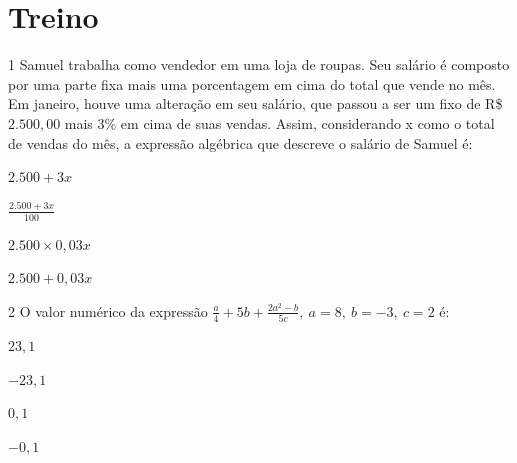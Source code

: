 \section{Treino}

\num{1} Samuel trabalha como vendedor em uma loja de roupas. Seu salário é
composto por uma parte fixa mais uma porcentagem em cima do total que
vende no mês. Em janeiro, houve uma alteração em seu salário, que passou
a ser um fixo de R\$ $2.500,00$ mais 3\% em cima de suas vendas. Assim,
considerando x como o total de vendas do mês, a expressão algébrica
que descreve o salário de Samuel é:

\begin{escolha}
  \item $2.500 + 3x$
  \item $\frac{2.500 + 3x}{100}$
  \item $2.500 \times 0,03x$
  \item $2.500 + 0,03x$
\end{escolha}



\num{2} O valor numérico da expressão
$\frac{a}{4} + 5b + \frac{2a^{2} - b}{5c},\ a = 8,\ b = - 3,\ c = 2$
é:

\begin{escolha}
\item $23,1$
\item $- 23,1$
\item $0,1$
\item $- 0,1$
\end{escolha}

